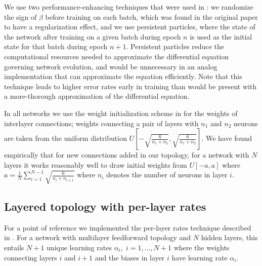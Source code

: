 \documentclass[utf8]{frontiersSCNS}
\begin{document}
We use two performance-enhancing techniques that were used in \citep{scellier17}: we randomize the sign of $\beta$ before training on each batch, which was found in the original paper to have a regularization effect, and we use persistent particles, where the state of the network after training on a given batch during epoch $n$ is used as the initial state for that batch during epoch $n+1$. Persistent particles reduce the computational resources needed to approximate the differential equation governing network evolution, and would be unnecessary in an analog implementation that can approximate the equation efficiently. Note that this technique leads to higher error rates early in training than would be present with a more-thorough approximation of the differential equation.

In all networks we use the weight initialization scheme in \citep{glorot2010} for the weights of interlayer connections; weights connecting a pair of layers with $n_1$ and $n_2$ neurons are taken from the uniform distribution $U[-\sqrt{\frac{6}{n_1+n_2}}, \sqrt{\frac{6}{n_1+n_2}}]$. We have found empirically that for new connections added in our topology, for a network with $N$ layers it works reasonably well to draw initial weights from $U[-a,a]$ where $a=\frac{1}{N}\sum_{i=1}^{N-1}\sqrt{\frac{6}{n_i+n_{i+1}}}$ where $n_i$ denotes the number of neurons in layer $i$.

\subsection{Layered topology with per-layer rates}
\label{sec:basic_topology}

For a point of reference we implemented the per-layer rates technique described in \citep{scellier17}. For a network with multilayer feedforward topology and $N$ hidden layers, this entails $N+1$ unique learning rates $\alpha_i,\;i=1,\hdots,N+1$ where the weights connecting layers $i$ and $i+1$ and the biases in layer $i$ have learning rate $\alpha_i$.

\end{document}
